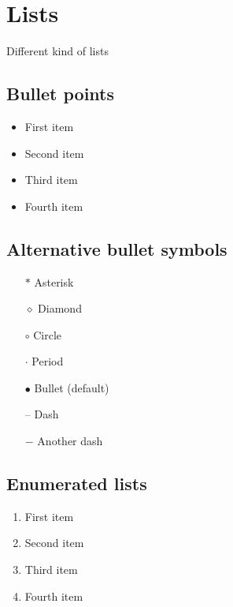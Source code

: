 \section{Lists}
Different kind of lists

\subsection{Bullet points}
\begin{itemize}
    \item First item
    \item Second item
    \item Third item
    \item Fourth item
\end{itemize}

\subsection{Alternative bullet symbols}
\begin{itemize}
    \item[$\ast$] Asterisk 
    \item[$\diamond$] Diamond 
    \item[$\circ$] Circle 
    \item[$\cdot$] Period
    \item[$\bullet$] Bullet (default)
    \item[--] Dash
    \item[$-$] Another dash
\end{itemize}

\subsection{Enumerated lists}
\begin{enumerate}
    \item First item
    \item Second item
    \item Third item
    \item Fourth item
\end{enumerate}


